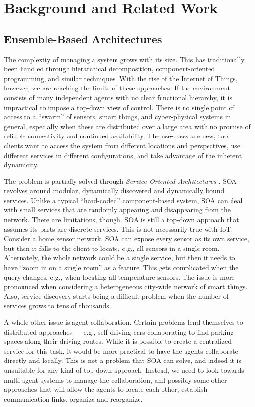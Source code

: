 \chapter{Background and Related Work}
\label{background}

\section{Ensemble-Based Architectures}
\label{background:ensembles}

The complexity of managing a system grows with its size. This has traditionally been
handled through hierarchical decomposition, component-oriented programming, and similar
techniques. With the rise of the Internet of Things, however, we are reaching the limits
of these approaches. If the environment consists of many independent agents with no
clear functional hierarchy, it is impractical to impose a top-down view of control.
There is no single point of access to a ``swarm'' of sensors, smart things, and
cyber-physical systems in general, especially when these are distributed over a large
area with no promise of reliable connectivity and continued availability. The use-cases
are new, too: clients want to access the system from different locations and
perspectives, use different services in different configurations, and take advantage of
the inherent dynamicity.

The problem is partially solved through \textit{Service-Oriented Architectures}
\citep{SOA}. SOA revolves around modular, dynamically discovered and dynamically bound
services. Unlike a typical ``hard-coded'' component-based system, SOA can deal with
small services that are randomly appearing and disappearing from the network. There are
limitations, though. SOA is still a top-down approach that assumes its parts are
discrete services. This is not necessarily true with IoT. Consider a home sensor
network. SOA can expose every sensor as its own service, but then it falls to the client
to locate, e.g., all sensors in a single room. Alternately, the whole network could be a
single service, but then it needs to have ``zoom in on a single room'' as a feature.
This gets complicated when the query changes, e.g., when locating all temperature
sensors. The issue is more pronounced when considering a heterogeneous city-wide network
of smart things. Also, service discovery starts being a difficult problem when the
number of services grows to tens of thousands.

A whole other issue is agent collaboration. Certain problems lend themselves to
distributed approaches --- e.g., self-driving cars collaborating to find parking spaces
along their driving routes. While it is possible to create a centralized service for
this task, it would be more practical to have the agents collaborate directly and
locally. This is not a problem that SOA can solve, and indeed it is unsuitable for any
kind of top-down approach. Instead, we need to look towards multi-agent systems to
manage the collaboration, and possibly some other approaches that will allow the agents
to locate each other, establish communication links, organize and reorganize.

